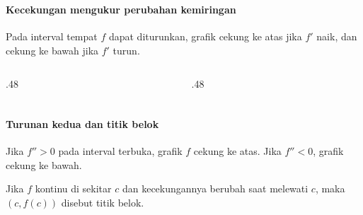 \documentclass{../../kalkulus-ppt}
\begin{document}
\begin{frame}
\frametitle{\insertsection}
\framesubtitle{Kecekungan mengukur perubahan kemiringan}

\begin{definisi}
Pada interval tempat $f$ dapat diturunkan, grafik cekung ke atas jika $f'$ naik, dan cekung ke bawah jika $f'$ turun.
\end{definisi}\begin{columns}[c]
\begin{column}{.48\textwidth}

\centering{}
\end{column}
\begin{column}{.48\textwidth}

\end{column}
\end{columns}
\end{frame}

\begin{frame}
\frametitle{\insertsection}
\framesubtitle{Turunan kedua dan titik belok}

\begin{teorema}
Jika $f''>0$ pada interval terbuka, grafik $f$ cekung ke atas. Jika $f''<0$, grafik cekung ke bawah.
\end{teorema}
\begin{definisi}
Jika $f$ kontinu di sekitar $c$ dan kecekungannya berubah saat melewati $c$, maka $(c,f(c))$ disebut titik belok.
\end{definisi}
\end{frame}
\end{document}
